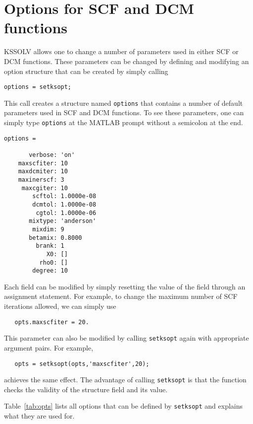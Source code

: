 \documentclass[11pt]{book}
\begin{document}
\section{Options for SCF and DCM functions} \label{sec:option}
KSSOLV allows one to change a number of parameters used in either
SCF or DCM functions.  These parameters can be changed by defining
and modifying an option structure that can be created by simply calling
\begin{verbatim}
options = setksopt;
\end{verbatim}
This call creates a structure named {\tt options} that contains
a number of default parameters used in SCF and DCM functions. To
see these parameters, one can simply type {\tt options} at the
MATLAB prompt without a semicolon at the end. 
\begin{verbatim}
options = 

       verbose: 'on'
    maxscfiter: 10
    maxdcmiter: 10
    maxinerscf: 3
     maxcgiter: 10
        scftol: 1.0000e-08
        dcmtol: 1.0000e-08
         cgtol: 1.0000e-06
       mixtype: 'anderson'
        mixdim: 9
       betamix: 0.8000
         brank: 1
            X0: []
          rho0: []
        degree: 10
\end{verbatim}

Each field can be modified by simply resetting the value of the field 
through an assignment statement. For example, to change the maximum
number of SCF iterations allowed, we can simply use
\begin{verbatim}
   opts.maxscfiter = 20.
\end{verbatim}
This parameter can also be modified by calling {\tt setksopt} again with
appropriate argument pairs. For example,
\begin{verbatim}
   opts = setksopt(opts,'maxscfiter',20);
\end{verbatim}
achieves the same effect.  The advantage of calling {\tt setksopt} is
that the function checks the validity of the structure field and its
value.

Table~\ref{tab:opts} lists all options that can be defined by {\tt setksopt}
and explains what they are used for.
\end{document}
